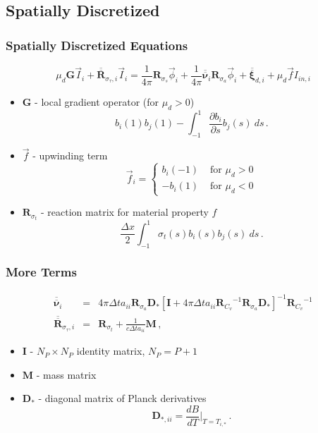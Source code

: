 \documentclass{beamer}
\newcommand{\be}{\begin{equation*}}   %
\newcommand{\ee}{\end{equation*}}
\newcommand{\bea}{\begin{eqnarray*}}  %
\newcommand{\eea}{\end{eqnarray*}}
\newcommand{\B}[1]{\ensuremath{b_{#1} }}			%
\newcommand{\R}[1]{\ensuremath{\mathbf{R}_{#1}}}
\newcommand{\D}{\ensuremath{ \mathbf{D}_* }}
\newcommand{\M}{\ensuremath{ \mathbf M}}
\newcommand{\p}{\ensuremath{ \partial}}			%
\newcommand{\pec}{\, ,}
\newcommand{\pep}{\, .}
\begin{document}
\subsection{Spatially Discretized}
\begin{frame}
\frametitle{Spatially Discretized Equations}
\be
\mu_d\mathbf{G} \vec{I}_i + \overline{\overline{\mathbf R}}_{\sigma_{\tau},i}\vec{I}_i = \frac{1}{4\pi}\R{\sigma_s}\vec{\phi}_i + \frac{1}{4\pi}\overline{\overline{\mathbf \nu}}_i \R{\sigma_a}\vec{\phi}_i + \overline{\overline{\mathbf \xi}}_{d,i} + \mu_d\vec{f}I_{in,i}
\ee
\begin{itemize}
\item $\mathbf{G}$ - local gradient operator (for $\mu_d > 0$)
\be
\B{i}(1)\B{j}(1) - \int_{-1}^1{\frac{\p \B{i}}{\p s}\B{j}(s)~ds} \pep
\ee
\item $\vec{f}$ - upwinding term 
\be
\vec{f}_i = \left\{ 
\begin{array}{ll}
\B{i}(-1)  & \text{  for } \mu_d>0 \\
-\B{i}(1)  & \text{  for } \mu_d<0 
\end{array}\right.
\ee
\item $\mathbf{R}_{\sigma_t}$ - reaction matrix for material property $f$
\be
\frac{\Delta x}{2}\int_{-1}^1{\sigma_t(s)\B{i}(s)\B{j}(s)~ds} \pep
\ee
\end{itemize}
\end{frame}

\begin{frame}
\frametitle{More Terms}
\bea
\overline{\overline{\mathbf \nu}}_i &=& 4\pi \Delta t a_{ii} \R{\sigma_a} \D \left[\mathbf{I} + 4\pi\Delta t a_{ii}\R{C_v}^{-1}\R{\sigma_a}\D  \right]^{-1}\R{C_v}^{-1}
\\
\overline{\overline{\mathbf R}}_{\sigma_{\tau},i} &=& \R{\sigma_t} + \frac{1}{c\Delta t a_{ii}}\M \pec
\eea
\begin{itemize}
\item $\mathbf{I}$ - $N_P \times N_P$ identity matrix, $N_P = P+1$ 
\item $\M$ - mass matrix
\item $\D$ - diagonal matrix of Planck derivatives
\be
\mathbf{D}_{*,ii} = \frac{d B}{d T} \bigg \lvert_{T = T_{i,*}} \pep
\ee 
\end{itemize}
\end{frame}
\end{document}
